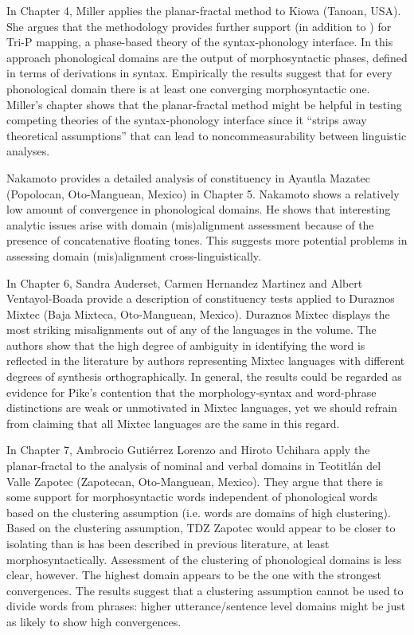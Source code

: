 \documentclass[output=paper,hidelinks]{langscibook}
\begin{document}
In Chapter 4, Miller applies the planar-fractal method to Kiowa (Tanoan, USA). She argues that the methodology provides further support (in addition to \cite{miller2021is}) for Tri-P mapping, a phase-based theory of the syntax-phonology interface. In this approach phonological domains are the output of morphosyntactic phases, defined in terms of derivations in syntax. Empirically the results suggest that for every phonological domain there is at least one converging morphosyntactic one. Miller's chapter shows that the planar-fractal method might be helpful in testing competing theories of the syntax-phonology interface since it ``strips away theoretical assumptions'' that can lead to noncommeasurability between linguistic analyses.

Nakamoto provides a detailed analysis of constituency in Ayautla Mazatec (Popolocan, Oto-Manguean, Mexico) in Chapter 5. Nakamoto shows a relatively low amount of convergence in phonological domains. He shows that interesting analytic issues arise with domain (mis)alignment assessment because of the presence of concatenative floating tones. This suggests more potential problems in assessing domain (mis)alignment cross-linguistically.

In Chapter 6, Sandra Auderset, Carmen Hernandez Martinez and Albert Venta\-yol-Boada provide a description of constituency tests applied to Duraznos Mixtec (Baja Mixteca, Oto-Manguean, Mexico). Duraznos Mixtec displays the most striking misalignments out of any of the languages in the volume. The authors show that the high degree of ambiguity in identifying the word is reflected in the literature by authors representing Mixtec languages with different degrees of synthesis orthographically. In general, the results could be regarded as evidence for Pike's contention that the morphology-syntax and word-phrase distinctions are weak or unmotivated in Mixtec languages, yet we should refrain from claiming that all Mixtec languages are the same in this regard.

In Chapter 7, Ambrocio Gutiérrez Lorenzo and Hiroto Uchihara apply the planar-fractal to  the analysis of nominal and verbal domains in Teotitlán del Valle Zapotec (Zapotecan, Oto-Manguean, Mexico). They argue that there is some support for morphosyntactic words independent of phonological words based on the clustering assumption (i.e. words are domains of high clustering). Based on the clustering assumption, TDZ Zapotec would appear to be closer to  isolating than is has been described in previous literature, at least morphosyntactically. Assessment of the clustering of phonological domains is less clear, however. The highest domain appears to be the one with the strongest convergences. The results suggest that a clustering assumption cannot be used to divide words from phrases: higher utterance/sentence level domains might be just as likely to show high convergences. 
\end{document}
